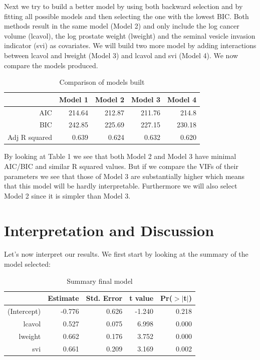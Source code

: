 \documentclass[10pt]{article}
\begin{document}
Next we try to build a better model by using both backward selection and by fitting all possible models and then selecting the one with the lowest BIC. Both methods result in the same model (Model 2) and only include the log cancer volume (lcavol), the log prostate weight (lweight) and the seminal vesicle invasion indicator (svi) as covariates. We will build two more model by adding interactions between lcavol and lweight (Model 3) and lcavol and svi (Model 4). We now compare the models produced.

\begin{table}[ht]
\centering
\caption{Comparison of models built} \label{criteriontable}
\begin{tabular}{rrrrr}
  \hline
 & Model 1 & Model 2 & Model 3 & Model 4 \\ 
  \hline
AIC & 214.64 & 212.87 & 211.76 & 214.8 \\ 
BIC & 242.85 & 225.69 & 227.15 & 230.18 \\ 
Adj R squared & 0.639 & 0.624 & 0.632 & 0.620 \\ 
  \hline
\end{tabular}
\end{table}

By looking at Table 1 we see that both Model 2 and Model 3 have minimal AIC/BIC and similar R squared values. But if we compare the VIFs of their parameters we see that those of Model 3 are substantially higher which means that this model will be hardly interpretable. Furthermore we will also select Model 2 since it is simpler than Model 3.

\section{Interpretation and Discussion}

\quad Let's now interpret our results. We first start by looking at the summary of the model selected:

\begin{table}[ht]
\centering
\caption{Summary final model} \label{summary}
\begin{tabular}{rrrrr}
  \hline
 & Estimate & Std. Error & t value & Pr($>$$|$t$|$) \\ 
  \hline
(Intercept) & -0.776 & 0.626 & -1.240 & 0.218 \\ 
  lcavol & 0.527 & 0.075 & 6.998 & 0.000 \\ 
  lweight & 0.662 & 0.176 & 3.752 & 0.000 \\ 
  svi & 0.661 & 0.209 & 3.169 & 0.002 \\ 
   \hline
\end{tabular}
\end{table}
\end{document}
